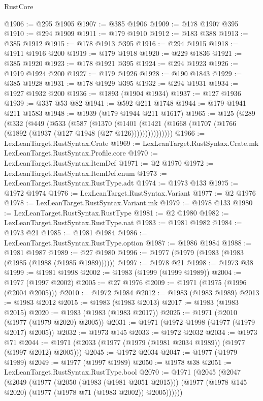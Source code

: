 \begin{lexlean}{RustCore}
\begin{coremodule}
@1906 := @295 @1905
@1907 := @385 @1906
@1909 := @178 @1907 @395
@1910 := @294 @1909
@1911 := @179 @1910
@1912 := @183 @388
@1913 := @385 @1912
@1915 := @178 @1913 @395
@1916 := @294 @1915
@1918 := @1911 @1916 @200
@1919 := @179 @1918
@1920 := @229 @1836
@1921 := @385 @1920
@1923 := @178 @1921 @395
@1924 := @294 @1923
@1926 := @1919 @1924 @200
@1927 := @179 @1926
@1928 := @190 @1843
@1929 := @385 @1928
@1931 := @178 @1929 @395
@1932 := @294 @1931
@1934 := @1927 @1932 @200
@1936 := @1893 (@1904 @1934)
@1937 := @127 @1936
@1939 := @337 @53 @82
@1941 := @592 @211 @1748
@1944 := @179 @1941 @211 @1583
@1948 := @1939 (@179 @1944 @211 @1617)
@1965 := @125
    (@289
      (@332
        (@449
          (@533
            (@587
              (@1370
                (@1401
                  (@1421 (@1668 (@1707 (@1766 (@1892 (@1937 (@127 @1948 (@27 @126)))))))))))))))
@1966 := LexLeanTarget.RustSyntax.Crate
@1969 := LexLeanTarget.RustSyntax.Crate.mk LexLeanTarget.RustSyntax.Profile.core
@1970 := LexLeanTarget.RustSyntax.ItemDef
@1971 := @2 @1970
@1972 := LexLeanTarget.RustSyntax.ItemDef.enum
@1973 := LexLeanTarget.RustSyntax.RustType.adt
@1974 := @1973 @133
@1975 := @1972 @1974
@1976 := LexLeanTarget.RustSyntax.Variant
@1977 := @2 @1976
@1978 := LexLeanTarget.RustSyntax.Variant.mk
@1979 := @1978 @133
@1980 := LexLeanTarget.RustSyntax.RustType
@1981 := @2 @1980
@1982 := LexLeanTarget.RustSyntax.RustType.nat
@1983 := @1981 @1982
@1984 := @1973 @21
@1985 := @1981 @1984
@1986 := LexLeanTarget.RustSyntax.RustType.option
@1987 := @1986 @1984
@1988 := @1981 @1987
@1989 := @27 @1980
@1996 := @1977 (@1979 (@1983 (@1983 (@1985 (@1988 (@1985 @1989))))))
@1997 := @1978 @21
@1998 := @1973 @38
@1999 := @1981 @1998
@2002 := @1983 (@1999 (@1999 @1989))
@2004 := @1977 (@1997 @2002)
@2005 := @27 @1976
@2009 := @1971 (@1975 (@1996 (@2004 @2005)))
@2010 := @1972 @1984
@2012 := @1983 (@1983 @1989)
@2013 := @1983 @2012
@2015 := @1983 (@1983 @2013)
@2017 := @1983 (@1983 @2015)
@2020 := @1983 (@1983 (@1983 @2017))
@2025 := @1971 (@2010 (@1977 (@1979 @2020) @2005))
@2031 := @1971 (@1972 @1998 (@1977 (@1979 @2017) @2005))
@2032 := @1973 @145
@2033 := @1972 @2032
@2034 := @1973 @71
@2044 := @1971 (@2033 (@1977 (@1979 (@1981 @2034 @1989)) (@1977 (@1997 @2012) @2005)))
@2045 := @1972 @2034
@2047 := @1977 (@1979 @1989)
@2049 := @1977 (@1997 @1989)
@2050 := @1978 @38
@2051 := LexLeanTarget.RustSyntax.RustType.bool
@2070 := @1971
    (@2045
      (@2047
        (@2049
          (@1977
            (@2050 (@1983 (@1981 @2051 @2015)))
            (@1977 (@1978 @145 @2020) (@1977 (@1978 @71 (@1983 @2002)) @2005))))))

\end{coremodule}
\end{lexlean}
